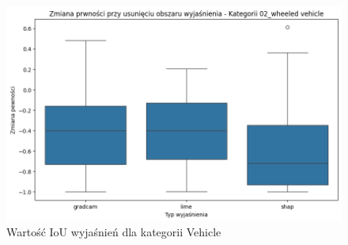 \begin{figure}
\begin{minipage}[b]{0.3\textwidth}
	\end{minipage}
	\begin{minipage}[b]{0.3\textwidth}
		\centering\includegraphics[width=.9\textwidth]{img/base_confidence_mask_vehicle}
		\caption{Wartość IoU wyjaśnień dla kategorii Vehicle}  \label{rys:base_confidence_mask_vehicle}
	\end{minipage}
\end{figure}
